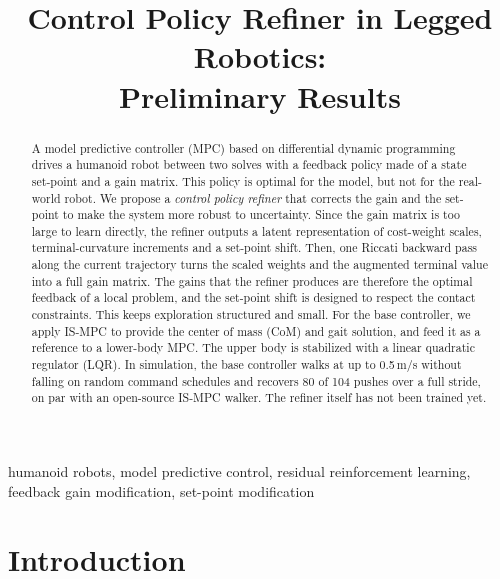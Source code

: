 \documentclass[conference]{IEEEtran}
\begin{document}

\title{Control Policy Refiner in Legged Robotics:\\ Preliminary Results}

\author{
}

\maketitle

\begin{abstract}
A model predictive controller (MPC) based on differential dynamic programming drives a humanoid robot between two solves with a feedback policy made of a state set-point and a gain matrix.
This policy is optimal for the model, but not for the real-world robot.
We propose a \emph{control policy refiner} that corrects the gain and the set-point to make the system more robust to uncertainty.
Since the gain matrix is too large to learn directly, the refiner outputs a latent representation of cost-weight scales, terminal-curvature increments and a set-point shift.
Then, one Riccati backward pass along the current trajectory turns the scaled weights and the augmented terminal value into a full gain matrix.
The gains that the refiner produces are therefore the optimal feedback of a local problem, and the set-point shift is designed to respect the contact constraints.
This keeps exploration structured and small.
For the base controller, we apply IS-MPC to provide the center of mass (CoM) and gait solution, and feed it as a reference to a lower-body MPC. The upper body is stabilized with a linear quadratic regulator (LQR).
In simulation, the base controller walks at up to 0.5\,m/s without falling on random command schedules and recovers 80 of 104 pushes over a full stride, on par with an open-source IS-MPC walker.
The refiner itself has not been trained yet.
\end{abstract}

\begin{IEEEkeywords}
humanoid robots, model predictive control, residual reinforcement learning, feedback gain modification, set-point modification
\end{IEEEkeywords}

\section{Introduction}
\end{document}
